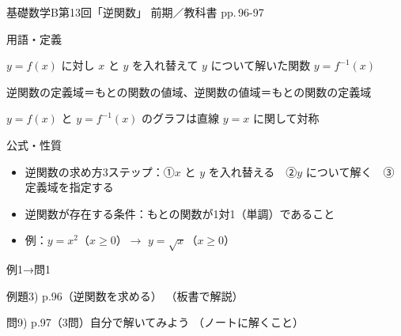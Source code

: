 \documentclass[aspectratio=43,professionalfonts,handout]{beamer}
\newcommand{\LectureNum}{13}
\newcommand{\LectureTitle}{逆関数}
\newcommand{\TextPages}{pp.\,96-97}
\newcommand{\CourseName}{基礎数学B}
\renewcommand{\TermName}{前期}
\begin{document}
\begin{frame}{\CourseName\quad 第\LectureNum 回「\LectureTitle 」}
  {\small \TermName\quad \TeacherName\quad ／\quad 教科書 \TextPages}

  \begin{block}{用語・定義}
  \begin{description}[labelwidth=5.5em]
    \item[\kw{逆関数}] $y=f(x)$ に対し $x$ と $y$ を入れ替えて $y$ について解いた関数 $y=f^{-1}(x)$
    \item[\kw{定義域・値域}] 逆関数の定義域＝もとの関数の値域、逆関数の値域＝もとの関数の定義域
    \item[\kw{対称性}] $y=f(x)$ と $y=f^{-1}(x)$ のグラフは直線 $y=x$ に関して対称
  \end{description}
  \end{block}
\end{frame}

\begin{frame}{公式・性質}
  \begin{block}{}
  \begin{itemize}
    \item 逆関数の求め方3ステップ：①$x$ と $y$ を入れ替える　②$y$ について解く　③定義域を指定する
    \item 逆関数が存在する条件：もとの関数が1対1（単調）であること
    \item 例：$y=x^2$（$x\geq 0$）$\to$ $y=\sqrt{x}$（$x\geq 0$）
  \end{itemize}
  \end{block}
\end{frame}

\begin{frame}{例1→問1}
  \begin{exampleblock}{例題3) p.96（逆関数を求める）}
    （板書で解説）
  \end{exampleblock}

  \vfill

  \begin{block}{問9) p.97（3問）\quad 自分で解いてみよう}
    （ノートに解くこと）
  \end{block}
\end{frame}
\end{document}

